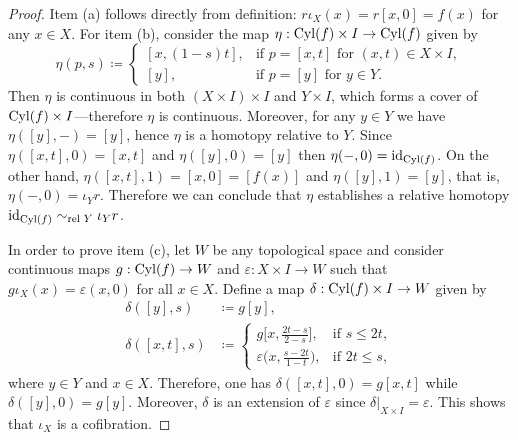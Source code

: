 \begin{proof}
    Item (a) follows directly from definition: \(r \iota_X(x) = r[x, 0] = f(x)\) for
    any \(x \in X\). For item (b), consider the map \(\eta: \operatorname{Cyl}(f) \times I \to
    \operatorname{Cyl}(f)\) given by
    \[
        \eta(p, s) \coloneq
        \begin{cases}
            [x, (1 - s) t], & \text{if } p = [x, t]
            \text{ for } (x, t) \in X \times I,                        \\
            [y],            & \text{if } p = [y] \text{ for } y \in Y.
        \end{cases}
    \]
    Then \(\eta\) is continuous in both \((X \times I) \times I\) and
    \(Y \times I\), which forms a cover of \(\operatorname{Cyl}(f) \times I\)---therefore \(\eta\)
    is continuous. Moreover, for any \(y \in Y\) we have \(\eta([y], -) = [y]\),
    hence \(\eta\) is a homotopy relative to \(Y\). Since
    \(\eta([x, t], 0) = [x, t]\) and \(\eta([y], 0) = [y]\) then
    \(\eta(-, 0) = \operatorname{id}_{\operatorname{Cyl}(f)}\). On the other hand,
    \(\eta([x, t], 1) = [x, 0] = [f(x)]\) and \(\eta([y], 1) = [y]\), that is,
    \(\eta(-, 0) = \iota_Y r\). Therefore we can conclude that \(\eta\) establishes
    a relative homotopy \(\operatorname{id}_{\operatorname{Cyl}(f)} \sim_{\text{rel }{Y}} \iota_Y r\).

    In order to prove item (c), let \(W\) be any topological space and consider
    continuous maps \(g: \operatorname{Cyl}(f) \to W\) and \(\varepsilon: X \times I \to W\) such
    that \(g \iota_X(x) = \varepsilon(x, 0)\) for all \(x \in X\). Define a map
    \(\delta: \operatorname{Cyl}(f) \times I \to W\) given by
    \begin{align*}
        \delta([y], s)    & \coloneq g[y], \\
        \delta([x, t], s) & \coloneq
        \begin{cases}
            g\big[x, \frac{2 t - s}{2 - s}\big],
             & \text{if } s \leq 2 t,
            \\
            \varepsilon\big(x, \frac{s - 2 t}{1 - t}\big),
             & \text{if } 2 t \leq s,
        \end{cases}
    \end{align*}
    where \(y \in Y\) and \(x \in X\). Therefore, one has
    \(\delta([x, t], 0) = g[x, t]\) while \(\delta([y], 0) = g[y]\). Moreover,
    \(\delta\) is an extension of \(\varepsilon\) since
    \(\delta|_{X \times I} = \varepsilon\). This shows that \(\iota_X\) is a
    cofibration.
\end{proof}

